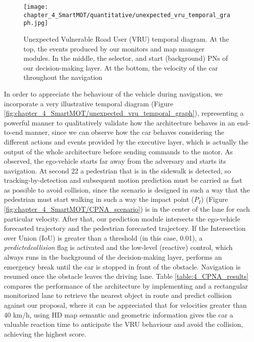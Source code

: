 \begin{figure}[h]
	\centering
	\texttt{[image: chapter\_4\_SmartMOT/quantitative/unexpected\_vru\_temporal\_graph.jpg]}
	\caption[Unexpected Vulnerable Road User (VRU) temporal diagram]{Unexpected Vulnerable Road User (VRU) temporal diagram. At the top, the events produced by our monitors and map manager modules. In the middle, the selector, and start (background) PNs of our decision-making layer. At the bottom, the velocity of the car throughout the navigation}
	\label{fig:chapter_4_SmartMOT/quantitative/unexpected_vru_temporal_graph}
\end{figure}

In order to appreciate the behaviour of the vehicle during navigation, we incorporate a very illustrative temporal diagram (Figure \ref{fig:chapter_4_SmartMOT/unexpected_vru_temporal_graph}), representing a powerful manner to qualitatively validate how the architecture behaves in an end-to-end manner, since we can observe how the car behaves considering the different actions and events \cite{gomez2021train} provided by the executive layer, which is actually the output of the whole architecture before sending commands to the motor. As observed, the ego-vehicle starts far away from the adversary and starts its navigation. At second 22 a pedestrian that is in the sidewalk is detected, so tracking-by-detection and subsequent motion prediction must be carried as fast as possible to avoid collision, since the scenario is designed in such a way that the pedestrian must start walking in such a way the impact point (\(P_I\)) (Figure \ref{fig:chapter_4_SmartMOT/CPNA_scenario}) is in the center of the lane for each particular velocity. After that, our prediction module intersects the ego-vehicle forecasted trajectory and the pedestrian forecasted trajectory. If the Intersection over Union (IoU) is greater than a threshold (in this case, 0.01), a \textit{predictedcollision} flag is activated and the low-level (reactive) control, which always runs in the background of the decision-making layer, performs an emergency break until the car is stopped in front of the obstacle. Navigation is resumed once the obstacle leaves the driving lane. Table \ref{table:4_CPNA_results} compares the performance of the architecture by implementing \cite{gomez2020real} and a rectangular monitorized lane to retrieve the nearest object in route and predict collision against our proposal, where it can be appreciated that for velocities greater than 40 km/h, using HD map semantic and geometric information gives the car a valuable reaction time to anticipate the VRU behaviour and avoid the collision, achieving the highest score. 

